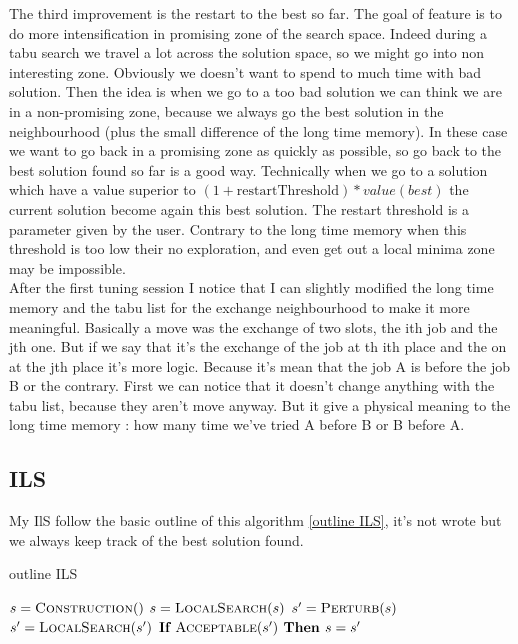 \documentclass[12pt,a4paper]{article}
\begin{document}
The third improvement is the restart to the best so far. The goal of feature is to do more intensification in promising zone of the search space. Indeed during a tabu search we travel a lot across the solution space, so we might go into non interesting zone. Obviously we doesn't want to spend to much time with bad solution. Then the idea is when we go to a too bad solution we can think we are in a non-promising zone, because we always go the best solution in the neighbourhood (plus the small difference of the long time memory). In these case we want to go back in a promising zone as quickly as possible, so go back to the best solution found so far is a good way. Technically when we go to a solution which have a value superior to $(1 + \text{restartThreshold}) * value(best)$ the current solution become again this best solution. The restart threshold is a parameter given by the user. Contrary to the long time memory when this threshold is too low their no exploration, and even get out a local minima zone may be impossible.\\

After the first tuning session I notice that I can slightly modified the long time memory and the tabu list for the exchange neighbourhood to make it more meaningful. Basically a move was the exchange of two slots, the ith job and the jth one. But if we say that it's the exchange of the job at th ith place and the on at the jth place it's more logic. Because it's mean that the job A is before the job B or the contrary. First we can notice that it doesn't change anything with the tabu list, because they aren't move anyway. But it give a physical meaning to the long time memory : how many time we've tried A before B or B before A.

\subsection{ILS}

My IlS follow the basic outline of this algorithm \ref{outline ILS}, it's not wrote but we always keep track of the best solution found.

\begin{algorithm}
\caption{outline ILS}
\begin{algorithmic}[1]
\State $s = \Call{Construction}$
\State $s = \Call{LocalSearch}{s}$
	\State $s' = \Call{Perturb}{s}$
	\State $s' = \Call{LocalSearch}{s'}$
	\State $\textbf{If } \Call{Acceptable}{s'} \textbf{ Then } s = s'$
\EndWhile	
\EndProcedure
\end{algorithmic}
\label{outline ILS}
\end{algorithm}
\end{document}
